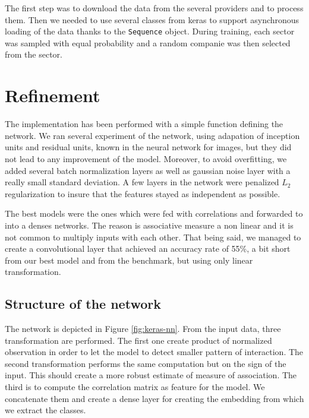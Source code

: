 \documentclass[a4paper,twoside]{article}
\begin{document}
The first step was to download the data from the several providers and to
process them. Then we needed to use several classes from keras to support
asynchronous loading of the data thanks to the \texttt{Sequence} object. During
training, each sector was sampled with equal probability and a random
companie was then selected from the sector.

\section{Refinement}
\label{sec:orgeb514e6}

The implementation has been performed with a simple function defining the
 network. We ran several experiment of the network, using adapation of
 inception units and residual units, known in the neural network for images,
 but they did not lead to any improvement of the model. Moreover, to avoid
 overfitting, we added several batch normalization layers as well as gaussian
 noise layer with a really small standard deviation. A few layers in the
 network were penalized \(L_2\) regularization to insure that the features
 stayed as independent as possible.

The best models were the ones which were fed with correlations and forwarded
to into a denses networks. The reason is associative measure a non linear and
it is not common to multiply inputs with each other. That being said, we
managed to create a convolutional layer that achieved an accuracy rate of
55\%, a bit short from our best model and from the benchmark, but using only
linear transformation.


\subsection{Structure of the network}
\label{sec:org89a789b}

The network is depicted in Figure \ref{fig:keras-nn}. From the input data,
three transformation are performed. The first one create product of
normalized observation in order to let the model to detect smaller pattern of
interaction. The second transformation performs the same computation but on
the sign of the input. This should create a more robust estimate of measure
of association. The third is to compute the correlation matrix as feature for
the model. We concatenate them and create a dense layer for creating the
embedding from which we extract the classes.
\end{document}
